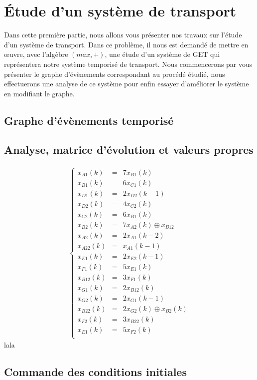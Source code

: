 \chapter{Étude d'un système de transport}
Dans cette première partie, nous allons vous présenter nos travaux sur l'étude d'un système de transport. Dans ce problème, il nous est demandé de mettre en œuvre, avec l'algèbre $(max,+)$, une étude d'un système de GET qui représentera notre système temporisé de transport. Nous commencerons par vous présenter le graphe d'évènements correspondant au procédé étudié, nous effectuerons une analyse de ce système pour enfin essayer d'améliorer le système en modifiant le graphe.

\section{Graphe d'évènements temporisé}

\section{Analyse, matrice d'évolution et valeurs propres}
\begin{align*}
\left\lbrace
\begin{array}{lcl}
x_{A1}(k) &=&7x_{B1}(k)\\ 
x_{B1}(k) &=&6x_{C1}(k)\\
x_{D1}(k) &=&2x_{D2}(k-1)\\
x_{D2}(k) &=&4x_{C2}(k)\\
x_{C2}(k) &=&6x_{B1}(k)\\
x_{B2}(k) &=&7x_{A2}(k) \oplus x_{B12}\\
x_{A2}(k) &=&2x_{A1}(k-2)\\
x_{A22}(k) &=&x_{A1}(k-1)\\
x_{E1}(k) &=&2x_{E2}(k-1)\\
x_{F1}(k) &=&5x_{E1}(k)\\
x_{B12}(k) &=&3x_{F1}(k)\\
x_{G1}(k) &=&2x_{B12}(k)\\
x_{G2}(k) &=&2x_{G1}(k-1)\\
x_{B22}(k) &=&2x_{G2}(k) \oplus x_{B2}(k)\\
x_{F2}(k) &=&3x_{B22}(k)\\
x_{E1}(k) &=&5x_{F2}(k)   \\  
\end{array}
\right.
\end{align*}
lala
\section{Commande des conditions initiales}


